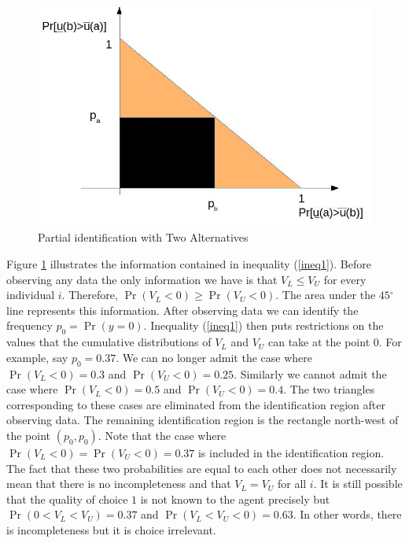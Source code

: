 \documentclass[reqno]{article}
\begin{document}
\begin{figure}[h!]
    \centering
    \includegraphics[scale=0.6]{idregion2.jpg}
    \caption{Partial identification with Two Alternatives}
    \label{fig:impreciseutilityidentification}
\end{figure}

Figure \ref{fig:impreciseutilityidentification} illustrates the information
contained in inequality (\ref{ineq1}). Before observing any data the only
information we have is that $V_{L}\leq V_{U}$ for every individual $i$.
Therefore, $\Pr \left( V_{L}<0\right) \geq \Pr \left( V_{U}<0\right) $. The
area under the $45{{}^\circ}$ line represents this information. After observing data we can identify the
frequency $p_{0}=\Pr \left( y=0\right) $. Inequality (\ref{ineq1}) then puts
restrictions on the values that the cumulative distributions of $V_{L}$ and $%
V_{U}$ can take at the point $0$. For example, say $p_{0}=0.37$. We can no
longer admit the case where $\Pr \left( V_{L}<0\right) =0.3$ and $\Pr \left(
V_{U}<0\right) =0.25$. Similarly we cannot admit the case where $\Pr \left(
V_{L}<0\right) =0.5$ and $\Pr \left( V_{U}<0\right) =0.4$. The two triangles
corresponding to these cases are eliminated from the identification region
after observing data. The remaining identification region is the rectangle
north-west of the point $\left( p_{0},p_{0}\right) $. Note that the case
where $\Pr (V_{L}<0)=\Pr \left( V_{U}<0\right) =0.37$ is included in the
identification region. The fact that these two probabilities are equal to
each other does not necessarily mean that there is no incompleteness and
that $V_{L}=V_{U}$ for all $i$. It is still possible that the quality of
choice $1$ is not known to the agent precisely but $\Pr \left(
0<V_{L}<V_{U}\right) =0.37$ and $\Pr \left( V_{L}<V_{U}<0\right) =0.63$. In
other words, there is incompleteness but it is choice irrelevant.
\end{document}
